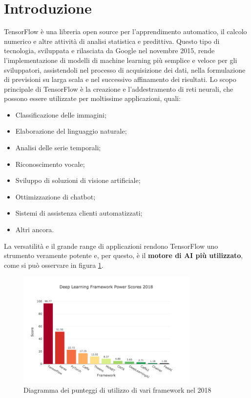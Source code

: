 \section{Introduzione}
TensorFlow\cite{databricks} è una libreria open source per l'apprendimento automatico, il calcolo numerico e altre attività di analisi statistica e predittiva. Questo
tipo di tecnologia, sviluppata e rilasciata da Google nel novembre 2015, rende l’implementazione di modelli di machine learning più semplice e veloce per
gli sviluppatori, assistendoli nel processo di acquisizione dei dati, nella formulazione di previsioni su larga scala e nel successivo affinamento dei risultati.
Lo scopo principale di TensorFlow è la creazione e l’addestramento di reti neurali, che possono essere utilizzate per moltissime applicazioni\cite{egovaleo}, quali:
\begin{itemize}
    \item Classificazione delle immagini;
    \item Elaborazione del linguaggio naturale;
    \item Analisi delle serie temporali;
    \item Riconoscimento vocale;
    \item Sviluppo di soluzioni di visione artificiale;
    \item Ottimizzazione di chatbot;
    \item Sistemi di assistenza clienti automatizzati;
    \item Altri ancora.
\end{itemize}

La versatilità e il grande range di applicazioni rendono TensorFlow uno strumento veramente potente e, per questo, è il \textbf{motore di AI più utilizzato},
come si può osservare in figura \ref{fig:diagramma}.

\begin{figure}[ht]
    \centering
    \includegraphics[width=0.8\textwidth]{Immagini/diagramma.png}
    \caption{Diagramma dei punteggi di utilizzo di vari framework nel 2018}
    \label{fig:diagramma}
\end{figure}

